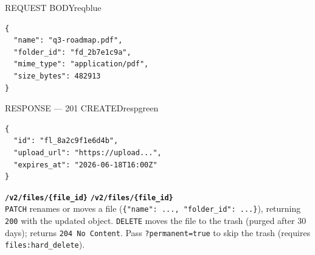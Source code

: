 \begin{minipage}[t]{0.48\textwidth}
\begin{jsonpanel}{REQUEST BODY}{reqblue}
\begin{lstlisting}
{
  "name": "q3-roadmap.pdf",
  "folder_id": "fd_2b7e1c9a",
  "mime_type": "application/pdf",
  "size_bytes": 482913
}
\end{lstlisting}
\end{jsonpanel}
\end{minipage}\hfill
\begin{minipage}[t]{0.48\textwidth}
\begin{jsonpanel}{RESPONSE — 201 CREATED}{respgreen}
\begin{lstlisting}
{
  "id": "fl_8a2c9f1e6d4b",
  "upload_url": "https://upload...",
  "expires_at": "2026-06-18T16:00Z"
}
\end{lstlisting}
\end{jsonpanel}
\end{minipage}
\par

\begin{routebox}
\hspace{6pt}\texttt{\textbf{/v2/files/\{file\_id\}}}\hspace{10pt}
\hspace{6pt}\texttt{\textbf{/v2/files/\{file\_id\}}}\\[3pt]
{\small \texttt{PATCH} renames or moves a file (\texttt{\{"name": ..., "folder\_id":
...\}}), returning \texttt{200} with the updated object. \texttt{DELETE} moves the file to
the trash (purged after 30 days); returns \texttt{204 No Content}. Pass
\texttt{?permanent=true} to skip the trash (requires \texttt{files:hard\_delete}).}
\end{routebox}

